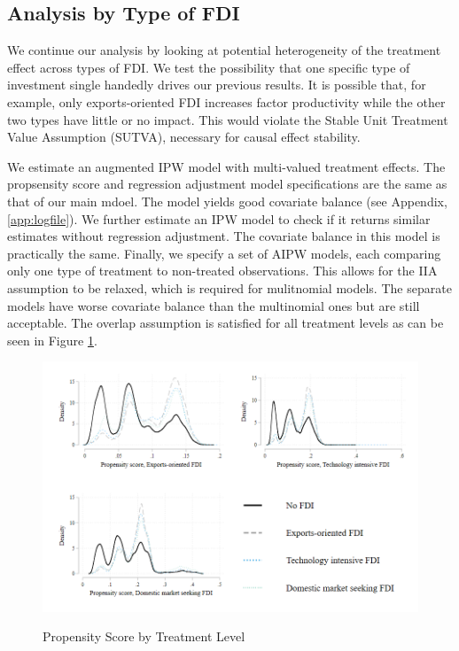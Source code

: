 \documentclass[a4paper,11pt]{scrartcl}
\begin{document}
\subsection{Analysis by Type of FDI}

We continue our analysis by looking at potential heterogeneity of the treatment effect across types of FDI. We test the possibility that one specific type of investment single handedly drives our previous results. It is possible that, for example, only exports-oriented FDI increases factor productivity while the other two types have little or no impact. This would violate the Stable Unit Treatment Value Assumption (SUTVA), necessary for causal effect stability. 

We estimate an augmented IPW model with multi-valued treatment effects. The propsensity score and regression adjustment model specifications are the same as that of our main mdoel. The model yields good covariate balance (see Appendix, \ref{app:logfile}). We further estimate an IPW model to check if it returns similar estimates without regression adjustment. The covariate balance in this model is practically the same. Finally, we specify a set of AIPW models, each comparing only one type of treatment to non-treated observations. This allows for the IIA assumption to be relaxed, which is required for mulitnomial models. The separate models have worse covariate balance than the multinomial ones but are still acceptable. The overlap assumption is satisfied for all treatment levels as can be seen in Figure \ref{fig:over_typ}. 

\begin{figure}[h]
	
	\caption{Propensity Score by Treatment Level}
	\includegraphics[width=\linewidth]{overlap_type.png}
	\label{fig:over_typ}
 
\end{figure}
\FloatBarrier
\end{document}
